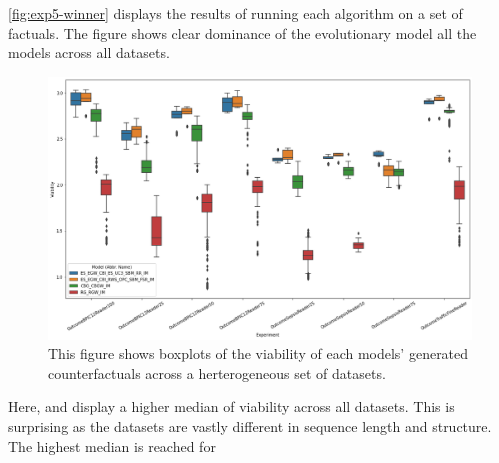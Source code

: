 \documentclass[./../../paper.tex]{subfiles}
\begin{document}
\autoref{fig:exp5-winner} displays the results of running each algorithm on a set of factuals. The figure shows clear dominance of the evolutionary model all the models across all datasets. 

\begin{figure}[htbp]
    \centering
    \includegraphics[width=\textwidth]{figures/generated/exp5_winner_overall.png}
    \caption{This figure shows boxplots of the viability of each models' generated counterfactuals across a herterogeneous set of datasets.}
    \label{fig:exp5-winner}
\end{figure}

Here,  and  display a higher median of viability across all datasets. This is surprising as the datasets are vastly different in sequence length and structure. The highest median is reached for 

\end{document}
